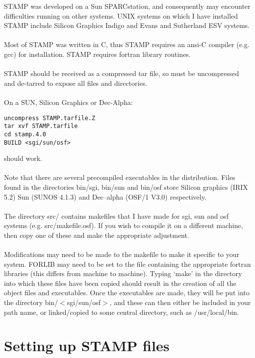 STAMP was developed on a Sun SPARCstation, and consequently may
encounter difficulties running on other systems.  UNIX systems
on which I have installed STAMP include Silicon Graphics Indigo 
and Evans and Sutherland ESV systems.\\
\\
Most of STAMP was written in C, thus STAMP requires an ansi-C 
compiler (e.g. gcc) for installation. 
STAMP requires fortran library routines.\\
\\
STAMP should be received as a compressed tar file, so must be 
uncompressed and de-tarred to expose all files and directories.\\
\\
On a SUN, Silicon Graphics or Dec-Alpha:\\

\begin{scriptsize}\begin{verbatim}
uncompress STAMP.tarfile.Z
tar xvf STAMP.tarfile
cd stamp.4.0
BUILD <sgi/sun/osf>
\end{verbatim} \end{scriptsize}

should work.\\
\\
Note that there are several precompiled executables in the distribution.  Files
found in the directories bin/sgi, bin/sun and bin/osf store Silicon graphics (IRIX 5.2)
Sun (SUNOS 4.1.3) and Dec--alpha (OSF/1 V3.0) respectively.\\
\\
The directory src/ contains makefiles that I have made for sgi, sun and osf
systems (e.g. src/makefile.osf).  If you wish to compile it on a different
machine, then copy one of these and make the appropriate adjustment.\\
\\
Modifications may need to be made to the makefile to make it specific
to your system.  FORLIB may need to be set to the file containing the 
appropriate fortran libraries (this differs from machine to machine). 
Typing `make' in the directory into which 
these files have been copied should result in the creation of all the 
object files and executables.  Once the executables are made, they 
will be put into the directory bin/$<$sgi/sun/osf$>$, and these can then either be
included in your path name, or linked/copied to some central 
directory, such as /usr/local/bin.

\section{Setting up STAMP files}

